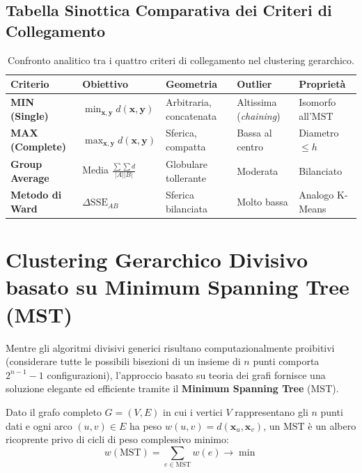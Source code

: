 \subsection{Tabella Sinottica Comparativa dei Criteri di Collegamento}

\begin{table}[htbp]
\centering
\footnotesize
\renewcommand{\arraystretch}{1.25}
\begin{tabularx}{\textwidth}{p{2.3cm} p{2.2cm} Y Y Y}
\toprule
\textbf{Criterio} & \textbf{Obiettivo} & \textbf{Geometria} & \textbf{Outlier} & \textbf{Proprietà} \\
\midrule
\textbf{MIN (Single)} & $\min_{\mathbf{x}, \mathbf{y}} d(\mathbf{x}, \mathbf{y})$ & Arbitraria, concatenata & Altissima (\textit{chaining}) & Isomorfo all'$\mathrm{MST}$ \\
\textbf{MAX (Complete)} & $\max_{\mathbf{x}, \mathbf{y}} d(\mathbf{x}, \mathbf{y})$ & Sferica, compatta & Bassa al centro & Diametro $\le h$ \\
\textbf{Group Average} & Media $\frac{\sum \sum d}{|A||B|}$ & Globulare tollerante & Moderata & Bilanciato \\
\textbf{Metodo di Ward} & $\Delta\mathrm{SSE}_{AB}$ & Sferica bilanciata & Molto bassa & Analogo K-Means \\
\bottomrule
\end{tabularx}
\caption{Confronto analitico tra i quattro criteri di collegamento nel clustering gerarchico.}
\label{tab:dm-linkage-criteria-synoptic}
\end{table}

\section{Clustering Gerarchico Divisivo basato su Minimum Spanning Tree (MST)}
\label{sec:dm-divisive-mst-clustering}

Mentre gli algoritmi divisivi generici risultano computazionalmente proibitivi (considerare tutte le possibili bisezioni di un insieme di $n$ punti comporta $2^{n-1} - 1$ configurazioni), l'approccio basato su teoria dei grafi fornisce una soluzione elegante ed efficiente tramite il \textbf{Minimum Spanning Tree} ($\mathrm{MST}$).

\begin{definition}
Dato il grafo completo $G = (V, E)$ in cui i vertici $V$ rappresentano gli $n$ punti dati e ogni arco $(u, v) \in E$ ha peso $w(u, v) = d(\mathbf{x}_u, \mathbf{x}_v)$, un $\mathrm{MST}$ è un albero ricoprente privo di cicli di peso complessivo minimo:
\begin{equation}
    w(\mathrm{MST}) = \sum_{e \in \mathrm{MST}} w(e) \to \min
\end{equation}
\end{definition}

